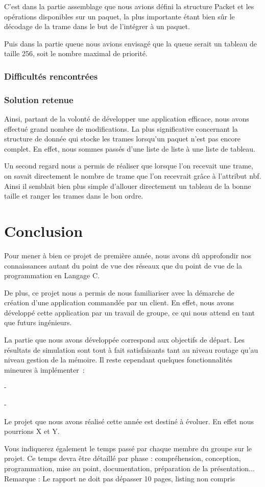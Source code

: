 \documentclass[a4paper,11pt]{article}
\begin{document}
C'est dans la partie assemblage que nous avions défini la structure Packet et les opérations disponibles sur un paquet, la plus importante étant bien sûr le décodage de la trame dans le but de l'intégrer à un paquet.

Puis dans la partie queue nous avions envisagé que la queue serait un tableau de taille 256, soit le nombre maximal de priorité. 


\subsubsection{Difficultés rencontrées}



\subsubsection{Solution retenue}

Ainsi, partant de la volonté de développer une application efficace, nous avons effectué grand nombre de modifications. La plus significative concernant la structure de donnée qui stocke les trames lorsqu'un paquet n'est pas encore complet. En effet, nous sommes passés d'une liste de liste à une liste de tableau.

Un second regard nous a permis de réaliser que lorsque l'on recevait une trame, on savait directement le nombre de trame que l'on recevrait grâce à l’attribut nbf. Ainsi il semblait bien plus simple d'allouer directement un tableau de la bonne taille et ranger les trames dans le bon ordre.

\section{Conclusion}

Pour mener à bien ce projet de première année, nous avons dû approfondir nos connaissances autant du point de vue des réseaux que du point de vue de la programmation en Langage C.

De plus, ce projet nous a permis de nous familiariser avec la démarche de création d’une application commandée par un client. En effet, nous avons développé cette application par un travail de groupe, ce qui nous attend en tant que futurs ingénieurs.

La partie que nous avons développée correspond aux objectifs de départ. Les résultats de simulation sont tout à fait satisfaisants tant au niveau routage qu’au niveau gestion de la mémoire. Il reste cependant quelques fonctionnalités mineures à implémenter : 

-	

-	

Le projet que nous avons réalisé cette année est destiné à évoluer. En effet nous pourrions X et Y.



Vous indiquerez également le temps passé par chaque membre du groupe sur le projet. Ce
temps devra être détaillé par phase : compréhension, conception, programmation, mise au
point, documentation, préparation de la présentation...
Remarque : Le rapport ne doit pas dépasser 10 pages, listing non compris
\end{document}
